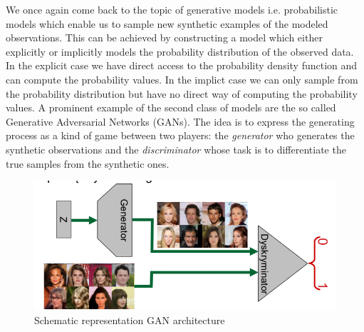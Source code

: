 \documentclass[a5paper]{article}
\begin{document}
We once again come back to the topic of generative models i.e. probabilistic models which enable us
to sample new synthetic examples of the modeled observations. This can be achieved by constructing a
model which either explicitly or implicitly models the probability distribution of the observed
data. In the explicit case we have direct access to the probability density function and can compute
the probability values. In the implict case we can only sample from the probability distribution but
have no direct way of computing the probability values. A prominent example of the second class of
models are the so called Generative Adversarial Networks (GANs). The idea is to express the
generating process as a kind of game between two players: the \emph{generator} who generates the
synthetic observations and the \emph{discriminator} whose task is to differentiate the true samples
from the synthetic ones.

\begin{figure}[ht]
   \centering
   \includegraphics[width=0.65\columnwidth]{figs/gan.png}
   \caption{Schematic representation GAN architecture \cite{Kurdziel}}
   \label{fig:gan}
\end{figure}
\end{document}
